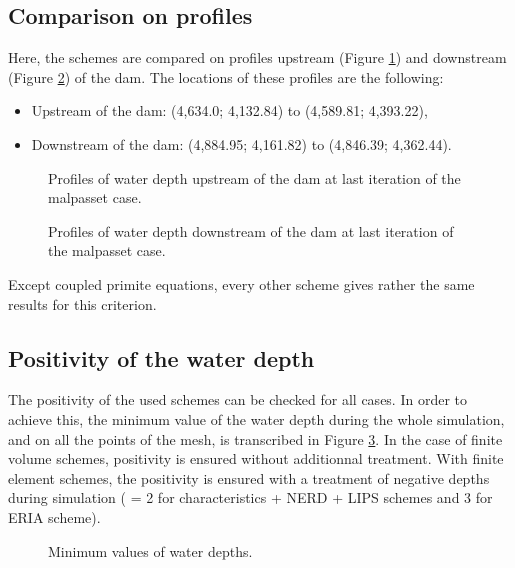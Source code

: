 \subsection{Comparison on profiles}
Here, the schemes are compared on profiles upstream
(Figure \ref{fig:malpasset:upstreamProfile}) and downstream (Figure
\ref{fig:malpasset:downstreamProfile}) of the dam.
The locations of these profiles are the following:
\begin{itemize}
\itemsep0em
\item Upstream of the dam: (4,634.0; 4,132.84) to (4,589.81; 4,393.22),
\item Downstream of the dam: (4,884.95; 4,161.82) to (4,846.39; 4,362.44).
\end{itemize}

\begin{figure}[H]
  \centering
  \caption{Profiles of water depth upstream of the dam at last iteration of the malpasset case.}
  \label{fig:malpasset:upstreamProfile}
\end{figure}

\begin{figure}[H]
  \centering
  \caption{Profiles of water depth downstream of the dam at last iteration of the malpasset case.}
  \label{fig:malpasset:downstreamProfile}
\end{figure}

Except coupled primite equations, every other scheme gives rather the same
results for this criterion.

\subsection{Positivity of the water depth}

The positivity of the used schemes can be checked for all cases.
In order to achieve this, the minimum value of the water depth during the whole
simulation, and on all the points of the mesh, is transcribed in Figure
\ref{fig:malpasset:minmax}.
In the case of finite volume schemes, positivity is ensured without additionnal
treatment.
With finite element schemes, the positivity is ensured with a treatment of
negative depths during simulation ( = 2
for characteristics + NERD + LIPS schemes and 3 for ERIA scheme).

\begin{figure}[H]
\centering
{}
\caption{Minimum values of water depths.}
\label{fig:malpasset:minmax}
\end{figure}

